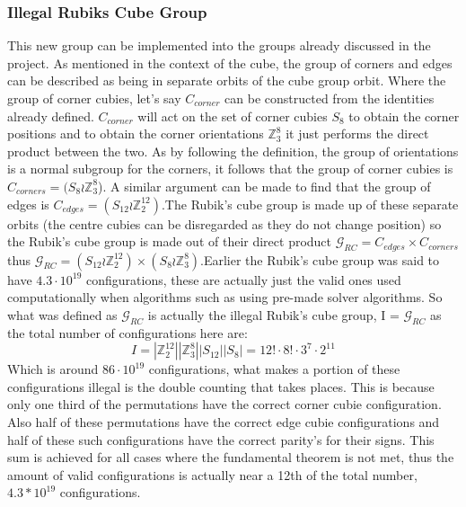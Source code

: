\documentclass{article}
\newcounter{theo}[section]\setcounter{theo}{0}
\newcounter{lem}[section]\setcounter{lem}{0}
\begin{document}
\subsubsection{Illegal Rubiks Cube Group}
This new group can be implemented into the groups already discussed in the project. As mentioned in the context of the cube, the group of corners and edges can be described as being in separate orbits of the cube group orbit. Where the group of corner cubies, let's say $C_{corner}$ can be constructed from the identities already defined. $C_{corner}$ will act on the set of corner cubies $S_{8}$ to obtain the corner positions and to obtain the corner orientations $\mathbb{Z}_{3}^{8}$ it just performs the direct product between the two. As by following the definition, the group of orientations is a normal subgroup for the corners, it follows that the group of corner cubies is $C_{corners} = (S_8 \wr \mathbb{Z}_{3}^{8}$). A similar argument can be made to find that the group of edges is $C_{edges} = (S_{12} \wr \mathbb{Z}_{2}^{12})$.\newline The Rubik's cube group is made up of these separate orbits (the centre cubies can be disregarded as they do not change position) so the Rubik's cube group is made out of their direct product $\mathcal{G}_{RC} = C_{edges} \times C_{corners}$ thus $\mathcal{G}_{RC} = (S_{12} \wr \mathbb{Z}_{2}^{12}) \times (S_8 \wr \mathbb{Z}_{3}^{8})$.\newline Earlier the Rubik's cube group was said to have $4.3\cdot10^{19}$ configurations, these are actually just the valid ones used computationally when algorithms such as using pre-made solver algorithms. So what was defined as $\mathcal{G}_{RC}$ is actually the illegal Rubik's cube group, I = $\mathcal{G}_{RC}$ as the total number of configurations here are:
\begin{equation}\label{23}
I = |\mathbb{Z}_{2}^{12}||\mathbb{Z}_{3}^{8}||S_{12}||S_8| =  12! \cdot 8! \cdot 3^7 \cdot 2^{11}
\end{equation}
Which is around $86 \cdot 10^{19}$ configurations, what makes a portion of these configurations illegal is the double counting that takes places. This is because only one third of the permutations have the correct corner cubie configuration. Also half of these permutations have the correct edge cubie configurations and half of these such configurations have the correct parity's for their signs. This sum is achieved for all cases where the fundamental theorem is not met, thus the amount of valid configurations is actually near a 12th of the total number,  $4.3*10^{19}$ configurations. 
\end{document}
